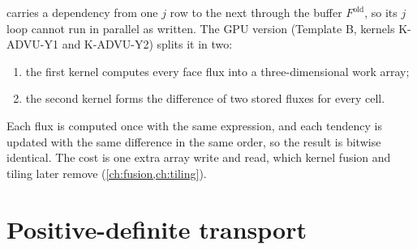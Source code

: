 \begin{portnote}
 carries a dependency from one $j$ row to the next through the buffer $F^{\mathrm{old}}$, so its
$j$ loop cannot run in parallel as written. The GPU version (Template B, kernels K-ADVU-Y1 and K-ADVU-Y2) splits it in
two:
\begin{enumerate}
  \item the first kernel computes every face flux into a three-dimensional work array;
  \item the second kernel forms the difference of two stored fluxes for every cell.
\end{enumerate}
Each flux is computed once with the same expression, and each tendency is updated with the same difference in the
same order, so the result is bitwise identical. The cost is one extra array write and read, which kernel fusion and
tiling later remove (\cref{ch:fusion,ch:tiling}).
\end{portnote}

\section{Positive-definite transport}

